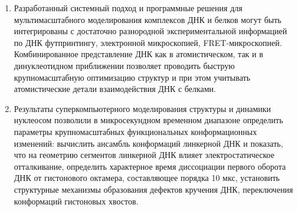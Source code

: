 \begin{enumerate}
\item Разработанный системный подход и программные решения для мультимасштабного моделирования комплексов ДНК и белков могут быть интегрированы с достаточно разнородной экспериментальной информацией по ДНК футпринтингу, электронной микроскопией, FRET-микроскопией. Комбинированное представление ДНК как в атомистическом, так и в динуклеотидном приближении позволяет проводить быструю крупномасштабную оптимизацию структур и при этом учитывать атомистические детали взаимодействия ДНК с белками.


  \item Результаты суперкомпьютерного моделирования структуры и динамики нуклеосом позволили в микросекундном временном диапазоне определить параметры крупномасштабных функциональных конформационных изменений: вычислить ансамбль конформаций линкерной ДНК и показать, что на геометрию сегментов линкерной ДНК влияет электростатическое отталкивание, определить характерное время диссоциации первого оборота ДНК от гистонового октамера, составляющее порядка 10 мкс, установить структурные механизмы образования дефектов кручения ДНК, переключения конформаций гистоновых хвостов.



\end{enumerate}
